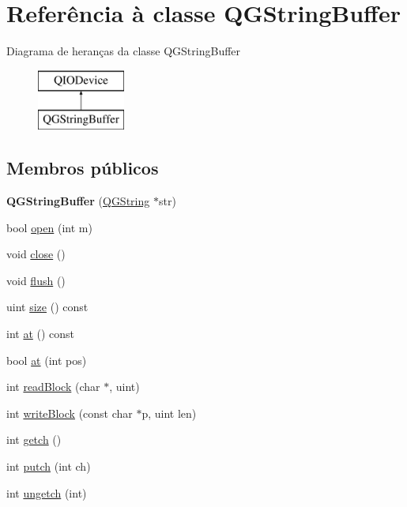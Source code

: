 \hypertarget{class_q_g_string_buffer}{\section{Referência à classe Q\-G\-String\-Buffer}
\label{class_q_g_string_buffer}
}
Diagrama de heranças da classe Q\-G\-String\-Buffer\begin{figure}[H]
\begin{center}
\leavevmode
\includegraphics[height=2.000000cm]{class_q_g_string_buffer}
\end{center}
\end{figure}
\subsection*{Membros públicos}
\begin{DoxyCompactItemize}
\item 
\hypertarget{class_q_g_string_buffer_a331951f21c0406ce87ac2ab19394ba9d}{{\bfseries Q\-G\-String\-Buffer} (\hyperlink{class_q_g_string}{Q\-G\-String} $\ast$str)}\label{class_q_g_string_buffer_a331951f21c0406ce87ac2ab19394ba9d}

\item 
bool \hyperlink{class_q_g_string_buffer_a2c4ec4ed8d34c778b4e7c7b4db3de4b2}{open} (int m)
\item 
void \hyperlink{class_q_g_string_buffer_a5ae591df94fc66ccb85cbb6565368bca}{close} ()
\item 
void \hyperlink{class_q_g_string_buffer_adac116554b543b7c4228c018a85882f5}{flush} ()
\item 
uint \hyperlink{class_q_g_string_buffer_a7e63723212bed1ca52f0fe57e58b812e}{size} () const 
\item 
int \hyperlink{class_q_g_string_buffer_a3bce8d0bb4d6fbaa012b9a61c3910907}{at} () const 
\item 
bool \hyperlink{class_q_g_string_buffer_aba2e4f48241029c25494e2645d088440}{at} (int pos)
\item 
int \hyperlink{class_q_g_string_buffer_a5b9fb6a6e465fb192ae8a94cfa4341f3}{read\-Block} (char $\ast$, uint)
\item 
int \hyperlink{class_q_g_string_buffer_abe680b02f9e888aee5900fe3e80d4a3b}{write\-Block} (const char $\ast$p, uint len)
\item 
int \hyperlink{class_q_g_string_buffer_a160f6d2893bb6b89ab3ad5d863c20e3d}{getch} ()
\item 
int \hyperlink{class_q_g_string_buffer_a5b7f09997f2156ba7b311416fee8a18e}{putch} (int ch)
\item 
int \hyperlink{class_q_g_string_buffer_a574c1d3f303340347106bf2cdaad5568}{ungetch} (int)
\end{DoxyCompactItemize}
